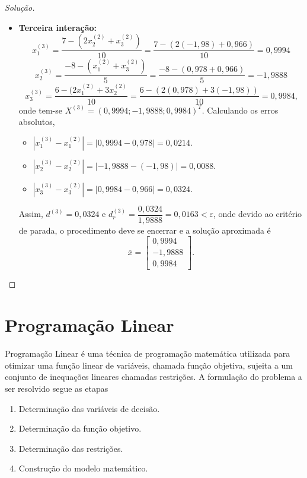 \documentclass[
	12pt,				%
	openright,			%
	twoside,			%
	a4paper,			%
	english,			%
	french,				%
	brazil,				%
	sumario=tradicional
]{abntex2}
\newenvironment{solution}{
	\begin{proof}[Solução]
}{\end{proof}}
\numberwithin{example}{chapter}
\numberwithin{remark}{chapter}
\numberwithin{definition}{chapter}
\numberwithin{figure}{chapter}
\begin{document}
\begin{solution}
\begin{itemize}
	    \item \textbf{Terceira interação: }\hfill
	    $$
	    	x_1^{(3)}=\frac{7-(2x_2^{(2)}+x_3^{(2)})}{10}
	    	=
	    	\frac{7-(2(-1,98)+0,966)}{10}
	    	=0,9994
	    $$
	    $$
	    	x_2^{(3)}=\frac{-8-(x_1^{(2)}+x_3^{(2)})}{5}
	    	=
	    	\frac{-8-(0,978+0,966)}{5}
	    	=-1,9888
	    $$
	    $$
	    	x_3^{(3)}=\frac{6-(2x_1^{(2)}+3x_2^{(2)}}{10}
	    	=
	    	\frac{6-(2(0,978)+3(-1,98))}{10}
	    	=0,9984
	    	\text{,}
	    $$
	    onde tem-se $X^{(3)}=(0,9994;-1,9888;0,9984)^T$. Calculando os erros absolutos,
	    \begin{itemize}
	    	\item $|x_1^{(3)}-x_1^{(2)}| = |0,9994-0,978|=0,0214$.
	    	\item $|x_2^{(3)}-x_2^{(2)}| = |-1,9888-(-1,98)|=0,0088$.
	    	\item $|x_3^{(3)}-x_3^{(2)}| = |0,9984-0,966|=0,0324$.
	    \end{itemize}
	    
	    Assim, $d^{(3)}=0,0324$ e $d_r^{(3)}=\dfrac{0,0324}{1,9888}=0,0163<\varepsilon$, onde devido ao critério de parada, o procedimento deve se encerrar e a solução aproximada é
	    $$
	    	\overline{x}=\begin{bmatrix}
	    		0,9994\\
	    		-1,9888\\
	    		0,9984
	    	\end{bmatrix}
	    	\text{.}
	    $$
	\end{itemize}
\end{solution}


\chapter{Programação Linear}

Programação Linear é uma técnica de programação matemática utilizada para otimizar uma função linear de variáveis, chamada função objetiva, sujeita a um conjunto de inequações lineares chamadas restrições. A formulação do problema a ser resolvido segue as etapas
\begin{enumerate}
    \item Determinação das variáveis de decisão.
    \item Determinação da função objetivo.
    \item Determinação das restrições.
    \item Construção do modelo matemático.
\end{enumerate}
\end{document}

